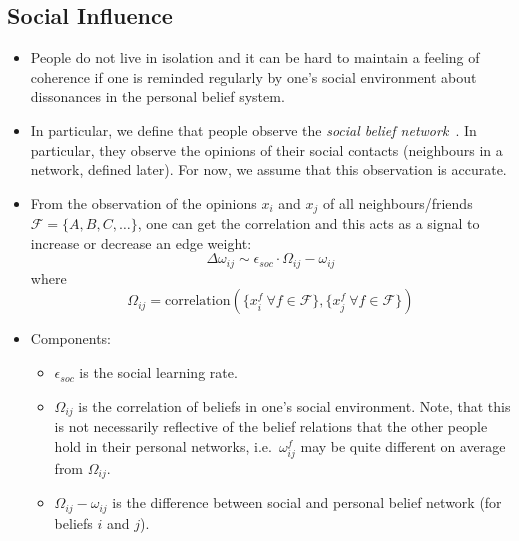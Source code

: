 \documentclass[10pt]{article}
\begin{document}
\subsection{Social Influence}
\begin{itemize}
    \item People do not live in isolation and it can be hard to maintain a feeling of coherence if one is reminded regularly by one's social environment about dissonances in the personal belief system.
    \item In particular, we define that people observe the \textit{social belief network}~\cite{boutylineBeliefNetworkAnalysis2017, brandtMeasuringBeliefSystem2022}. In particular, they observe the opinions of their social contacts (neighbours in a network, defined later). For now, we assume that this observation is accurate.
    \item From the observation of the opinions $x_i$ and $x_j$ of all neighbours/friends $\mathcal{F} = \{A, B, C, \ldots\}$, one can get the correlation and this acts as a signal to increase or decrease an edge weight:
    \begin{equation}
        \Delta \omega_{ij} \sim  \epsilon_{soc} \cdot \Omega_{ij} - \omega_{ij}
    \end{equation}
    where 
    \begin{equation}
        \Omega_{ij} = \text{correlation}(\{x_i^f \ \forall f \in \mathcal{F}\}, \{x_j^f  \ \forall f \in \mathcal{F}\})
    \end{equation}
    \item Components: 
    \begin{itemize}
        \item $\epsilon_{soc}$ is the social learning rate.
        \item $\Omega_{ij}$ is the correlation of beliefs in one's social environment. Note, that this is not necessarily reflective of the belief relations that the other people hold in their personal networks, i.e.\ $\omega_{ij}^f$ may be quite different on average from $\Omega_{ij}$.
        \item $\Omega_{ij} - \omega_{ij}$ is the difference between social and personal belief network (for beliefs $i$ and $j$). 

\end{itemize}
\end{itemize}
\end{document}
